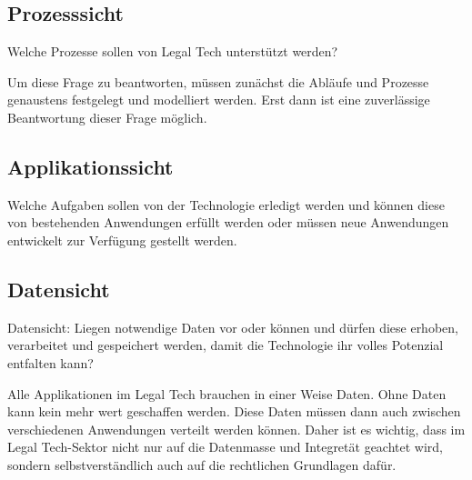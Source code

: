 \subsection{Prozesssicht}
Welche Prozesse sollen von Legal Tech unterstützt werden?

Um diese Frage zu beantworten, müssen zunächst die Abläufe und Prozesse genaustens festgelegt und modelliert werden. Erst dann ist eine zuverlässige Beantwortung dieser Frage möglich. 

\subsection{Applikationssicht}
Welche Aufgaben sollen von der Technologie erledigt werden und können diese von bestehenden Anwendungen erfüllt werden oder müssen neue Anwendungen entwickelt zur Verfügung gestellt werden.

\subsection{Datensicht}
Datensicht: Liegen notwendige Daten vor oder können und dürfen diese erhoben, verarbeitet und gespeichert werden, damit die Technologie ihr volles Potenzial entfalten kann?

Alle Applikationen im Legal Tech brauchen in einer Weise Daten. Ohne Daten kann kein mehr wert geschaffen werden. Diese Daten müssen dann auch zwischen verschiedenen Anwendungen verteilt werden können. Daher ist es wichtig, dass im Legal Tech-Sektor nicht nur auf die Datenmasse und Integretät geachtet wird, sondern selbstverständlich auch auf die rechtlichen Grundlagen dafür.